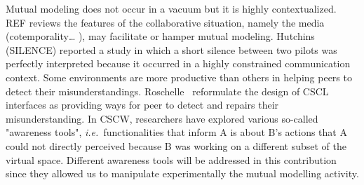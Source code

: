 \documentclass[twocolumn]{article}
\newcommand{\ie}{{\textit{i.e.\ }}}
\begin{document}
Mutual modeling does not occur in a vacuum but it is highly contextualized. REF
reviews the features of the collaborative situation, namely the media
(cotemporality… ), may facilitate or hamper mutual modeling. Hutchins (SILENCE)
reported a study in which a short silence between two pilots was perfectly
interpreted because it occurred in a highly constrained communication context.
Some environments are more productive than others in helping peers to detect
their misunderstandings. Roschelle~\citep{roschelle1995construction} reformulate
the design of CSCL interfaces as providing ways for peer to detect and repairs
their misunderstanding. In CSCW, researchers have explored various so-called
"awareness tools", \ie functionalities that inform A is about B's actions that A
could not directly perceived because B was working on a different subset of the
virtual space. Different awareness tools will be addressed in this contribution
since they allowed us to manipulate experimentally the mutual modelling activity. 
\end{document}
